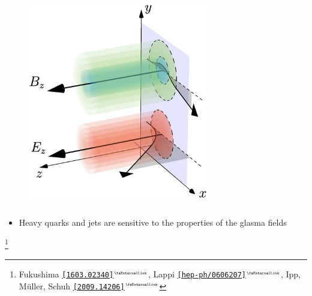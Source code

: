 \documentclass[aspectratio=169,11pt,usenames,dvipsnames]{beamer}
\renewcommand{\thefootnote}{\color{customblue}\faPaperPlaneO}
\newcommand\blfootnote[1]{%
  \begingroup
  \renewcommand\thefootnote{}\footnote{#1}%
  \addtocounter{footnote}{-1}%
  \endgroup
}
\begin{document}
\begin{frame}
\begin{columns}[onlytextwidth,t]
        \begin{center}
            \begin{figure}
                \centering
                \includegraphics[width=0.7\textwidth]{images/1-s2.0-S0370269320306134-gr003_lrg.jpg}
            \end{figure}
        \end{center}

    \end{columns}
        \begin{itemize}\itemsep0em 
            \item \begin{center}Heavy quarks and jets are sensitive to the properties of the glasma fields\end{center}
        \end{itemize}
    \blfootnote{\scriptsize Fukushima \href{https://arxiv.org/abs/1603.02340}{{\color{palteal}\texttt{[1603.02340]}$^\text{\tiny\faExternalLink}$}}, Lappi \href{https://arxiv.org/abs/hep-ph/0606207}{{\color{palviolet}\texttt{[hep-ph/0606207]}$^\text{\tiny\faExternalLink}$}}, Ipp, Müller, Schuh \href{https://arxiv.org/abs/2009.14206}{{\color{palgold}\texttt{[2009.14206]}$^\text{\tiny\faExternalLink}$}}}
\end{frame}

\end{document}
